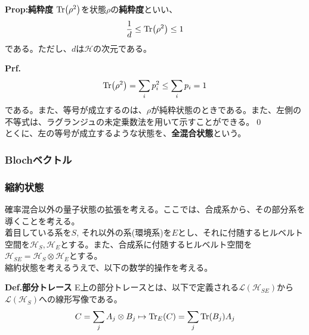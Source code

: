 \documentclass[a4paper,11pt]{jsarticle}
\numberwithin{equation}{section}
\begin{document}
\begin{itembox}[l]{\textbf{Prop:純粋度}}
    $\Tr(\rho^2)$を状態$\rho$の\textbf{純粋度}といい、
    \begin{align}
        \frac{1}{d} \leq \Tr(\rho^2) \leq 1
    \end{align}
    である。ただし、$d$は$\mathcal{H}$の次元である。
\end{itembox}
\textbf{Prf.}\\
\begin{align}
    \Tr(\rho^2) = \sum_i p_i^2 \leq \sum_i p_i = 1
\end{align}
である。また、等号が成立するのは、$\rho$が純粋状態のときである。また、左側の不等式は、ラグランジュの未定乗数法を用いて示すことができる。\qed\\ %
とくに、左の等号が成立するような状態を、\textbf{全混合状態}という。\\

\subsubsection{Blochベクトル}

\subsubsection{縮約状態}
確率混合以外の量子状態の拡張を考える。ここでは、合成系から、その部分系を導くことを考える。\\
着目している系を$S$, それ以外の系(環境系)を$E$とし、それに付随するヒルベルト空間を$\mathcal{H}_S, \mathcal{H}_E$とする。また、合成系に付随するヒルベルト空間を$\mathcal{H}_{SE} = \mathcal{H}_S \otimes \mathcal{H}_E$とする。\\
縮約状態を考えるうえで、以下の数学的操作を考える。
\begin{itembox}[l]{\textbf{Def.部分トレース}}
    E上の部分トレースとは、以下で定義される$\mathcal{L}(\mathcal{H}_{SE})$から$\mathcal{L}(\mathcal{H}_S)$への線形写像である。
    \begin{align}
        C = \sum_{j} A_j \otimes B_j \mapsto \Tr_E(C) = \sum_j \Tr(B_j)A_j
    \end{align}
\end{itembox}
\end{document}

